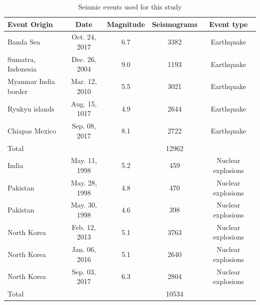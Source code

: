 \documentclass[12pt]{article}
\begin{document}
        \begin{table}[!ht]
            \caption{Seismic events used for this study}
            \vspace{0.5em}
            \label{tab:events_list}
            \centering
            \begin{tabular}{ l c c c c}
            \hline
             Event Origin & Date & Magnitude & Seismograms & Event type \\
             \hline 
              
             Banda Sea & Oct. 24, 2017 & 6.7 & 3382 & Earthquake\\
             Sumatra, Indonesia & Dec. 26, 2004 & 9.0 & 1193 &  Earthquake \\
             Myanmar India border & Mar. 12, 2010 & 5.5 & 3021 & Earthquake \\
             Ryukyu islands & Aug. 15, 1017 & 4.9 & 2644 &  Earthquake \\
             Chiapas Mexico & Sep. 08, 2017 & 8.1  & 2722 &  Earthquake \\
             \hline
             Total & & & 12962 &\\
             \hline
             \hline
             India & May. 11, 1998 & 5.2 & 459 & Nuclear explosions \\
             Pakistan & May. 28, 1998 & 4.8 & 470 & Nuclear explosions \\
             Pakistan & May. 30, 1998 & 4.6 & 398 & Nuclear explosions \\
             North Korea & Feb. 12, 2013 & 5.1  & 3763 & Nuclear explosions \\
             North Korea & Jan. 06, 2016 & 5.1  & 2640 & Nuclear explosions \\
             North Korea & Sep. 03, 2017 & 6.3  & 2804 & Nuclear explosions \\
             \hline
             Total & & & 10534 &\\
             \hline
            \end{tabular}
        \end{table}
    
\end{document}
